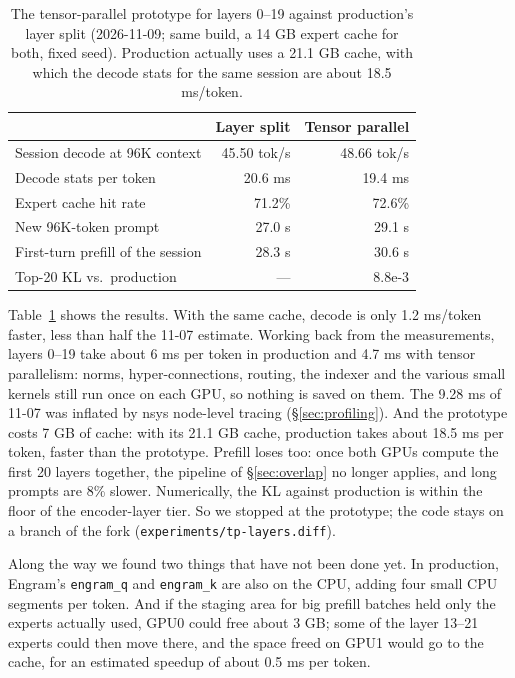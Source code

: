 \documentclass[11pt,a4paper]{article}
\newcommand{\code}[1]{\texttt{#1}}
\newcommand{\tps}{tok/s}
\begin{document}
\begin{table}[h]
  \centering
  \small
  \caption{The tensor-parallel prototype for layers 0--19 against production's layer split (2026-11-09; same build, a 14 GB expert cache for both, fixed seed). Production actually uses a 21.1 GB cache, with which the decode stats for the same session are about 18.5 ms/token.}
  \label{tab:tp}
  \begin{tabular}{@{}l r r@{}}
    \toprule
     & Layer split & Tensor parallel \\
    \midrule
    Session decode at 96K context & 45.50 \tps{} & 48.66 \tps{} \\
    Decode stats per token & 20.6 ms & 19.4 ms \\
    Expert cache hit rate & 71.2\% & 72.6\% \\
    New 96K-token prompt & 27.0 s & 29.1 s \\
    First-turn prefill of the session & 28.3 s & 30.6 s \\
    Top-20 KL vs.\ production & --- & 8.8e-3 \\
    \bottomrule
  \end{tabular}
\end{table}

Table~\ref{tab:tp} shows the results. With the same cache, decode is only 1.2 ms/token faster, less than half the 11-07 estimate. Working back from the measurements, layers 0--19 take about 6 ms per token in production and 4.7 ms with tensor parallelism: norms, hyper-connections, routing, the indexer and the various small kernels still run once on each GPU, so nothing is saved on them. The 9.28 ms of 11-07 was inflated by nsys node-level tracing (\S\ref{sec:profiling}). And the prototype costs 7 GB of cache: with its 21.1 GB cache, production takes about 18.5 ms per token, faster than the prototype. Prefill loses too: once both GPUs compute the first 20 layers together, the pipeline of \S\ref{sec:overlap} no longer applies, and long prompts are 8\% slower. Numerically, the KL against production is within the floor of the encoder-layer tier. So we stopped at the prototype; the code stays on a branch of the fork (\code{experiments/tp-layers.diff}).

Along the way we found two things that have not been done yet. In production, Engram's \code{engram\_q} and \code{engram\_k} are also on the CPU, adding four small CPU segments per token. And if the staging area for big prefill batches held only the experts actually used, GPU0 could free about 3 GB; some of the layer 13--21 experts could then move there, and the space freed on GPU1 would go to the cache, for an estimated speedup of about 0.5 ms per token.
\end{document}
